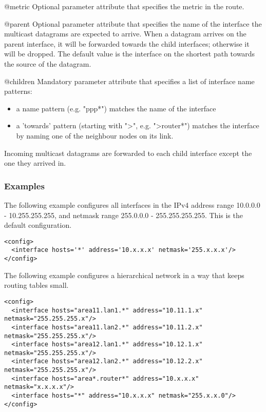 \begin{description}
\begin{compactdesc}
   \item[@metric]
     Optional parameter attribute that specifies the metric in the route.

   \item[@parent]
     Optional parameter attribute that specifies the name of the interface
     the multicast datagrams are expected to arrive. When a datagram arrives
     on the parent interface, it will be forwarded towards the child interfaces;
     otherwise it will be dropped. The default value is the interface on the
     shortest path towards the source of the datagram.

   \item[@children]
     Mandatory parameter attribute that specifies a list of interface name
     patterns:
     \begin{itemize}
      \item a name pattern (e.g. "ppp*") matches the name of the interface
      \item a 'towards' pattern (starting with ">", e.g. ">router*") matches the interface
        by naming one of the neighbour nodes on its link.
     \end{itemize}
     Incoming multicast datagrams are forwarded to each child interface except the
     one they arrived in.
   \end{compactdesc}
\end{description}

\subsubsection*{Examples}

The following example configures all interfaces in the IPv4 address range
10.0.0.0 - 10.255.255.255, and netmask range 255.0.0.0 - 255.255.255.255.
This is the default configuration.

\begin{verbatim}
<config>
  <interface hosts='*' address='10.x.x.x' netmask='255.x.x.x'/>
</config>
\end{verbatim}

The following example configures a hierarchical network in a way that keeps
routing tables small.
\begin{verbatim}
<config>
  <interface hosts="area11.lan1.*" address="10.11.1.x" netmask="255.255.255.x"/>
  <interface hosts="area11.lan2.*" address="10.11.2.x" netmask="255.255.255.x"/>
  <interface hosts="area12.lan1.*" address="10.12.1.x" netmask="255.255.255.x"/>
  <interface hosts="area12.lan2.*" address="10.12.2.x" netmask="255.255.255.x"/>
  <interface hosts="area*.router*" address="10.x.x.x" netmask="x.x.x.x"/>
  <interface hosts="*" address="10.x.x.x" netmask="255.x.x.0"/>
</config>
\end{verbatim}



